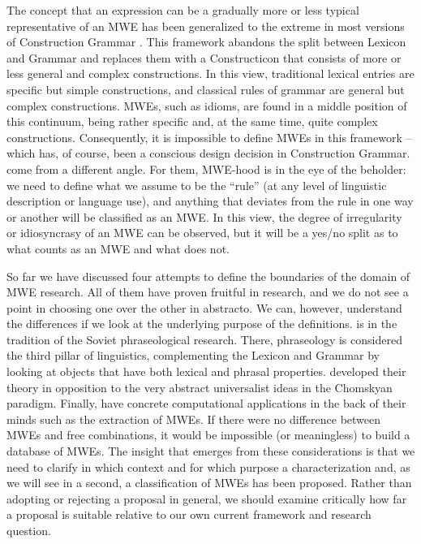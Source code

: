 \documentclass[output=paper]{langsci/langscibook}
\begin{document}
The concept that an expression can be a gradually more or less typical representative of an MWE has been generalized to the extreme in most versions of Construction Grammar   \citep{FillmoreEtAl1988}. This framework abandons the split between Lexicon and Grammar and replaces them with a Constructicon that consists of more or less general and complex constructions. In this view, traditional lexical entries are specific but simple constructions, and classical rules of grammar are general but complex constructions. MWEs, such as idioms, are found in a middle position of this continuum, being rather specific and, at the same time, quite complex constructions. Consequently, it is impossible to define MWEs in this framework – which has, of course, been a conscious design decision in Construction Grammar. \cite{Baldwin2010} come from a different angle. For them, MWE-hood is in the eye of the beholder: we need to define what we assume to be the “rule” (at any level of linguistic description or language use), and anything that deviates from the rule in one way or another will be classified as an MWE. In this view, the degree of irregularity or idiosyncrasy of an MWE can be observed, but it will be a yes/no split as to what counts as an MWE and what does not. 

So far we have discussed four attempts to define the boundaries of the domain of MWE research. All of them have proven fruitful in research, and we do not see a point in choosing one over the other in abstracto. We can, however, understand the differences if we look at the underlying purpose of the definitions. \citet{Fleischer:97} is in the tradition of the Soviet phraseological research. There, phraseology is considered the third pillar of linguistics, complementing the Lexicon and Grammar by looking at objects that have both lexical and phrasal properties. \citet{FillmoreEtAl1988} developed their theory in opposition to the very abstract universalist ideas in the Chomskyan paradigm. Finally, \citet{Baldwin2010}  have concrete computational applications in the back of their minds such as the extraction of MWEs. If there were no difference between MWEs and free combinations, it would be impossible (or meaningless) to build a database of MWEs. The insight that emerges from these considerations is that we need to clarify in which context and for which purpose a characterization and, as we will see in a second, a classification of MWEs has been proposed. Rather than adopting or rejecting a proposal in general, we should examine critically how far a proposal is suitable relative to our own current framework and research question.
\end{document}
